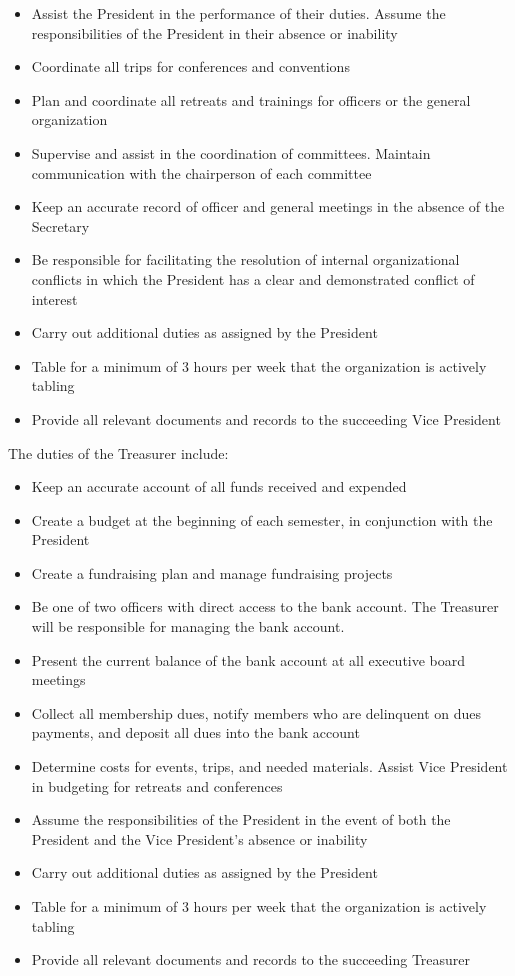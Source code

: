 \documentclass{article}
\begin{document}
\begin{itemize}
    \item Assist the President in the performance of their duties. Assume the responsibilities of the President in their absence or inability
    \item Coordinate all trips for conferences and conventions
    \item Plan and coordinate all retreats and trainings for officers or the general organization
    \item Supervise and assist in the coordination of committees. Maintain communication with the chairperson of each committee
    \item Keep an accurate record of officer and general meetings in the absence of the Secretary
    \item Be responsible for facilitating the resolution of internal organizational conflicts in which the President has a clear and demonstrated conflict of interest
    \item Carry out additional duties as assigned by the President
    \item Table for a minimum of 3 hours per week that the organization is actively tabling
    \item Provide all relevant documents and records to the succeeding Vice President
\end{itemize}

\noindent
The duties of the Treasurer include:

\begin{itemize}
    \item Keep an accurate account of all funds received and expended
    \item Create a budget at the beginning of each semester, in conjunction with the President
    \item Create a fundraising plan and manage fundraising projects
    \item Be one of two officers with direct access to the bank account. The Treasurer will be responsible for managing the bank account.
    \item Present the current balance of the bank account at all executive board meetings
    \item Collect all membership dues, notify members who are delinquent on dues payments, and deposit all dues into the bank account
    \item Determine costs for events, trips, and needed materials. Assist Vice President in budgeting for retreats and conferences
    \item Assume the responsibilities of the President in the event of both the President and the Vice President’s absence or inability
    \item Carry out additional duties as assigned by the President
    \item Table for a minimum of 3 hours per week that the organization is actively tabling
    \item Provide all relevant documents and records to the succeeding Treasurer
\end{itemize}
\end{document}
